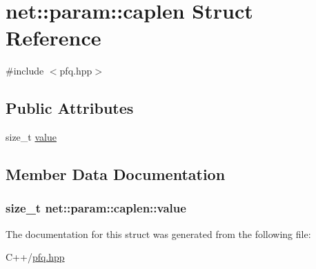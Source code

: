 \hypertarget{structnet_1_1param_1_1caplen}{\section{net\-:\-:param\-:\-:caplen Struct Reference}
\label{structnet_1_1param_1_1caplen}
}


{\ttfamily \#include $<$pfq.\-hpp$>$}

\subsection*{Public Attributes}
\begin{DoxyCompactItemize}
\item 
size\-\_\-t \hyperlink{structnet_1_1param_1_1caplen_a48064660e860d24789528b4651528d58}{value}
\end{DoxyCompactItemize}


\subsection{Member Data Documentation}
\hypertarget{structnet_1_1param_1_1caplen_a48064660e860d24789528b4651528d58}{
\subsubsection[{value}]{\setlength{\rightskip}{0pt plus 5cm}size\-\_\-t net\-::param\-::caplen\-::value}}\label{structnet_1_1param_1_1caplen_a48064660e860d24789528b4651528d58}


The documentation for this struct was generated from the following file\-:\begin{DoxyCompactItemize}
\item 
C++/\hyperlink{pfq_8hpp}{pfq.\-hpp}\end{DoxyCompactItemize}
